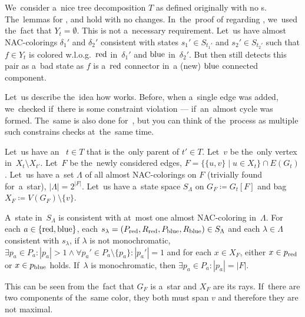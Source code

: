 We~consider a~nice tree decomposition \( T \) as defined originally
with no \IntroduceEdgeNode{}s.
The~lemmas for
\LeafNode{}, \RootNode{} and \ForgetVertexNode{} hold with no changes.
%
In~the~proof of 
regarding \JoinNode{},
we~used the~fact that \( Y_t = \emptyset \).
This is not a~necessary requirement.
%
Let~us have almost NAC-colorings \( \delta_1' \) and \( \delta_2' \)
consistent with states \( s_1' \in S_{t_1'} \) and \( s_2' \in S_{t_2'} \)
such that \( f \in Y_t \) is colored w.l.o.g.\ \( \text{red} \) in~\( \delta_1' \)
and \( \text{blue} \) in~\( \delta_2' \).
But then 
still detects this pair as a~bad state
as \( f \) is a~\( \text{red} \) connector in~a (new) \( \text{blue} \) connected component.

Let~us describe the~idea how \IntroduceVertexWithEdgesNode{} works.
Before, when a~single edge was added,
we~checked if~there is some constraint violation
--- if~an~almost cycle was formed.
The~same is also done for~\IntroduceVertexWithEdgesNode{},
but you can think of the~process as
multiple such constrains checks at~the~same time.

Let~us have an~\IntroduceVertexWithEdgesNode{} \( t \in T \) that
is the~only parent of \( t' \in T \).
Let~\( v \) be the~only vertex in~\( X_t \setminus X_{t'} \).
Let~\( F \) be the~newly considered edges,
\( F = \{ \{ u, v \} \mid u \in X_t \} \cap E(G_t) \).
%
Let~us have a~set \( \Lambda \) of all almost NAC-colorings on \( F \)
(trivially found for~a~star), \( |\Lambda| = 2^{|F|} \).
Let~us have a~state space \( S_\Lambda \) on \( G_F \coloneqq G_t[F] \)
and bag \( X_F \coloneqq V(G_F) \setminus \{ v \} \).
%
\begin{observation}
	A~state in~\( S_\Lambda \) is consistent with at~most one
	almost NAC-coloring in~\( \Lambda \).
	For each \( a \in \{\text{red}, \text{blue}\} \), each
	\( s_\lambda = (P_{\text{red}}, R_{\text{red}}, P_{\text{blue}}, R_{\text{blue}}) \in S_\Lambda \)
	and each \( \lambda \in \Lambda \) consistent with \( s_\lambda \),
	if \( \lambda \) is not monochromatic,
	\( {\exists p_a \in P_a} : {|p_a| > 1
	\land \forall p_a' \in P_a \setminus \{p_a\} : |p_a'| = 1} \)
	and for each \( x \in X_F \), either \( x \in p_{\text{red}} \) or \( x \in p_{\text{blue}} \) holds.
	If~\( \lambda \) is monochromatic, then \( {\exists p_a \in P_a} : {|p_a| = |F|} \).
\end{observation}
%
This can be seen from the~fact that \( G_F \) is a~star and \( X_F \) are its rays.
If~there are two components of the~same color,
they both must span \( v \)
and therefore they are not maximal.

